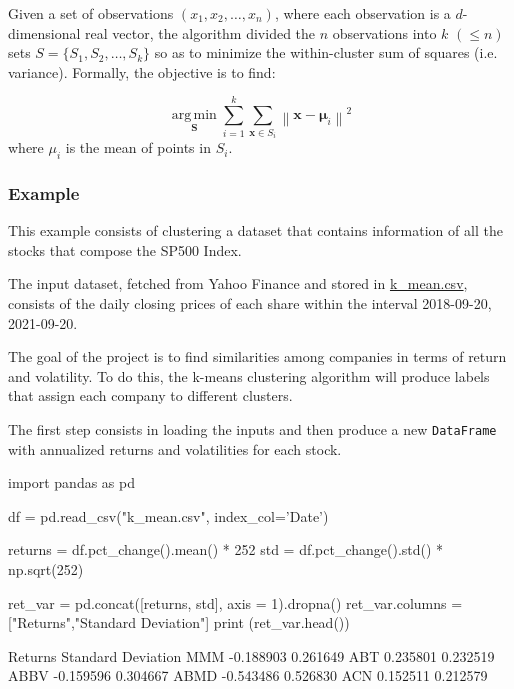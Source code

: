 Given a set of observations $(x_1, x_2, \ldots, x_n)$, where each observation is a $d$-dimensional real vector, the algorithm divided the $n$ observations into $k$ $(\leq n)$ sets $S = \{S_1, S_2, \ldots, S_k\}$ so as to minimize the within-cluster sum of squares (i.e. variance). Formally, the objective is to find:
    
\begin{equation}
\underset {\mathbf {S}}{\operatorname {arg\,min} } \sum _{i=1}^{k}\sum _{\mathbf {x} \in S_{i}}\left\|\mathbf {x} -{\boldsymbol {\mu }}_{i}\right\|^{2}
\end{equation}
where $\mu_i$ is the mean of points in $S_i$. 
    
\subsubsection{Example}
This example consists of clustering a dataset that contains information of all the stocks that compose the SP500 Index. 
    
The input dataset, fetched from Yahoo Finance and stored in \href{https://github.com/matteosan1/finance_course/raw/develop/libro/input_files/k\_mean.csv}{k\_mean.csv}, consists of the daily closing prices of each share within the interval 2018-09-20, 2021-09-20.
    
The goal of the project is to find similarities among companies in terms of return and volatility. To do this, the k-means clustering algorithm will produce labels that assign each company to different clusters.
 
The first step consists in loading the inputs and then produce a new \texttt{DataFrame} with annualized returns and volatilities for each stock. 
 
\begin{ipythonnon}
import pandas as pd
 
df = pd.read_csv("k_mean.csv", index_col='Date')
 
returns = df.pct_change().mean() * 252
std = df.pct_change().std() * np.sqrt(252)
 
ret_var = pd.concat([returns, std], axis = 1).dropna()
ret_var.columns = ["Returns","Standard Deviation"]
print (ret_var.head())
\end{ipythonnon}
\begin{ioutput}
       Returns  Standard Deviation
MMM  -0.188903            0.261649
ABT   0.235801            0.232519
ABBV -0.159596            0.304667
ABMD -0.543486            0.526830
ACN   0.152511            0.212579
\end{ioutput}

